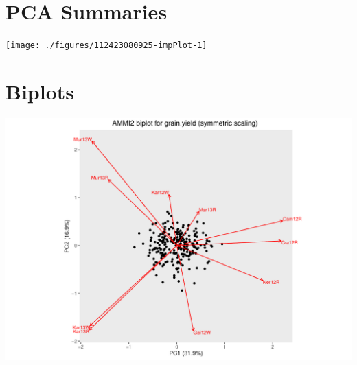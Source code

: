 \documentclass[a4paper,11pt]{article}\usepackage[]{graphicx}\usepackage[]{xcolor}
\makeatletter
\def\maxwidth{ %
  \ifdim\Gin@nat@width>\linewidth
    \linewidth
  \else
    \Gin@nat@width
  \fi
}
\newenvironment{kframe}{%
 \def\at@end@of@kframe{}%
 \ifinner\ifhmode%
  \def\at@end@of@kframe{\end{minipage}}%
  \begin{minipage}{\columnwidth}%
 \fi\fi%
 \def\FrameCommand##1{\hskip\@totalleftmargin \hskip-\fboxsep
 \colorbox{shadecolor}{##1}\hskip-\fboxsep
     \hskip-\linewidth \hskip-\@totalleftmargin \hskip\columnwidth}%
 \MakeFramed {\advance\hsize-\width
   \@totalleftmargin\z@ \linewidth\hsize
   \@setminipage}}%
 {\par\unskip\endMakeFramed%
 \at@end@of@kframe}
\newenvironment{knitrout}{}{} %
\makeatother
\begin{document}
\clearpage
\section{PCA Summaries}

\begin{table}[ht]
\begin{flushleft}
\label{importance}
\end{flushleft}
\end{table}


\begin{knitrout}
\color{fgcolor}\begin{kframe}
\end{kframe}

\texttt{[image: ./figures/112423080925-impPlot-1]} \hfill{}


\end{knitrout}
\newpage

\section{Biplots}
\begin{knitrout}
\color{fgcolor}\begin{kframe}
\end{kframe}
\includegraphics[width=0.9\maxwidth]{./figures/112423080925-biplot-1} 
\end{knitrout}

\end{document}

